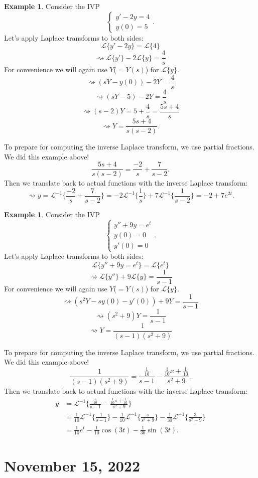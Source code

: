 \documentclass[12pt]{amsart}
\numberwithin{equation}{section}
\theoremstyle{plain} %
\newcommand{\Nov}[1]{\section{November #1, 2022}}
\newcommand{\rsa}{\rightsquigarrow}
\theoremstyle{definition}
\newtheorem{ex}[equation]{Example}
\theoremstyle{remark}
\newcommand{\LA}[1]{\mathcal{L}\{ #1 \}}
\newcommand{\LAi}[1]{\mathcal{L}^{-1}\{ #1 \}}
\begin{document}
\begin{ex}
Consider the IVP
\[ \begin{cases} y' - 2y = 4 \\ y(0) = 5\end{cases}.\]
Let's apply Laplace transforms to both sides:
\[ \LA{ y' - 2y} = \LA{4}\]
\[\rsa \LA{y'} - 2 \LA{y} = \frac{4}{s}\]
For convenience we will again use $Y$($=Y(s)$) for $\LA{y}$.
\[ \rsa (sY - y(0)) - 2 Y =\frac{4}{s}\]
\[ \rsa (sY - 5) - 2 Y =\frac{4}{s}\]
\[ \rsa (s-2)Y = 5+\frac{4}{s} = \frac{5s+4}{s}\]
\[ \rsa Y = \frac{5s+4}{s(s-2)}.\]

To prepare for computing the inverse Laplace transform, we use partial fractions. We did this example above!
\[ \frac{5s+4}{s(s-2)} = \frac{-2}{s} + \frac{7}{s-2}.\]
Then we translate back to actual functions with the inverse Laplace transform:
\[ \rsa y = \LAi{\frac{-2}{s} + \frac{7}{s-2}} = -2 \LAi{\frac{1}{s}} + 7 \LAi{\frac{1}{s-2}} = -2 + 7e^{2t}.\]
\end{ex}

\begin{ex}
Consider the IVP
\[ \begin{cases} y'' +9y = e^t \\ y(0) = 0 \\ y'(0)=0\end{cases}.\]
Let's apply Laplace transforms to both sides:
\[ \LA{  y'' +9y = e^t} = \LA{e^t}\]
\[\rsa \LA{y''} + 9 \LA{y} = \frac{1}{s-1}\]
For convenience we will again use $Y$($=Y(s)$) for $\LA{y}$.
\[ \rsa (s^2Y - sy(0)-y'(0)) +9 Y =\frac{1}{s-1}\]
\[ \rsa (s^2+9)Y=\frac{1}{s-1}\]
\[ \rsa Y =\frac{1}{(s-1)(s^2+9)}\]

To prepare for computing the inverse Laplace transform, we use partial fractions. We did this example above!
\[ \frac{1}{(s-1)(s^2+9)} = \frac{\frac{1}{10}}{s-1} - \frac{\frac{1}{10}x+\frac{1}{10}}{s^2+9}. \]
Then we translate back to actual functions with the inverse Laplace transform:
\begin{align*} y &= \LAi{\frac{\frac{1}{10}}{s-1} - \frac{\frac{1}{10}s+\frac{1}{10}}{s^2+9}} \\&=\frac{1}{10} \LAi{\frac{1}{s-1}} - \frac{1}{10} \LAi{\frac{s}{s^2+9}}  - \frac{1}{30} \LAi{\frac{3}{s^2+9}} \\&= \frac{1}{10} e^t- \frac{1}{10} \cos(3t)-\frac{1}{30} \sin(3t).
\end{align*}
\end{ex}



\Nov{15}
\end{document}
